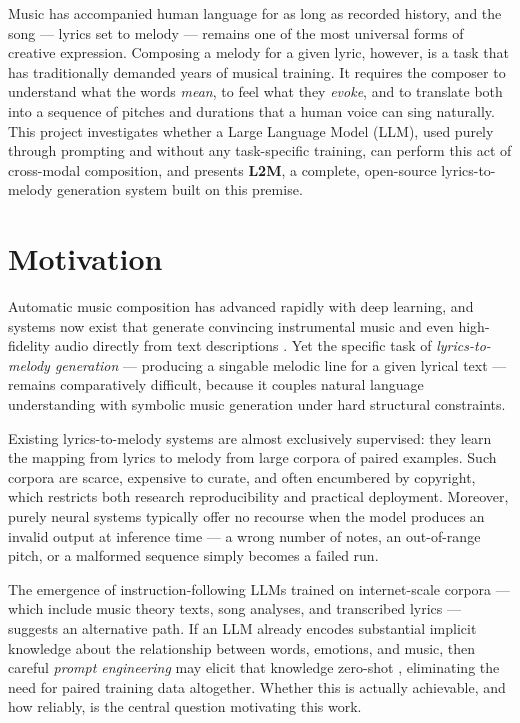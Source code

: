 Music has accompanied human language for as long as recorded history, and the
song --- lyrics set to melody --- remains one of the most universal forms of
creative expression. Composing a melody for a given lyric, however, is a task
that has traditionally demanded years of musical training. It requires the
composer to understand what the words \emph{mean}, to feel what they
\emph{evoke}, and to translate both into a sequence of pitches and durations
that a human voice can sing naturally. This project investigates whether a
Large Language Model (LLM), used purely through prompting and without any
task-specific training, can perform this act of cross-modal composition, and
presents \textbf{L2M}, a complete, open-source lyrics-to-melody generation
system built on this premise.

\section{Motivation}
\label{sec:motivation}

Automatic music composition has advanced rapidly with deep learning, and
systems now exist that generate convincing instrumental music
\cite{briot20deeplearning, huang18musictransformer} and even high-fidelity
audio directly from text descriptions \cite{agostinelli23musiclm,
copet23musicgen}. Yet the specific task of \emph{lyrics-to-melody generation}
--- producing a singable melodic line for a given lyrical text --- remains
comparatively difficult, because it couples natural language understanding
with symbolic music generation under hard structural constraints.

Existing lyrics-to-melody systems \cite{bao19neural, sheng21songmass,
ju22telemelody, zhang22relyme, ding24songcomposer} are almost exclusively
supervised: they learn the mapping from lyrics to melody from large corpora
of paired examples. Such corpora are scarce, expensive to curate, and often
encumbered by copyright, which restricts both research reproducibility and
practical deployment. Moreover, purely neural systems typically offer no
recourse when the model produces an invalid output at inference time ---
a wrong number of notes, an out-of-range pitch, or a malformed sequence
simply becomes a failed run.

The emergence of instruction-following LLMs trained on internet-scale corpora
--- which include music theory texts, song analyses, and transcribed lyrics
--- suggests an alternative path. If an LLM already encodes substantial
implicit knowledge about the relationship between words, emotions, and music,
then careful \emph{prompt engineering} may elicit that knowledge zero-shot
\cite{brown20fewshot}, eliminating the need for paired training data
altogether. Whether this is actually achievable, and how reliably, is the
central question motivating this work.

